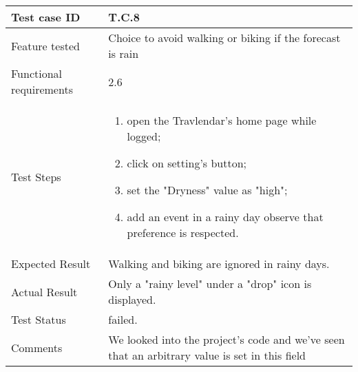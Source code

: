 \begin{table}[H]
	\begin{center}
		\begin{tabular}{ | p{} | p{} | }
		\hline
		Test case ID & T.C.8\\
		\hline
		Feature tested & Choice to avoid walking or biking if the forecast is rain\\
		\hline
		Functional requirements & 2.6  \\
		\hline
		Test Steps & 
			\begin{enumerate}
				\item open the Travlendar's home page while logged;
				\item click on setting's button;
				\item set the "Dryness" value as "high";
				\item  add an event in a rainy day observe that preference is respected.
			\end{enumerate} \\
		\hline
		Expected Result & Walking and biking are ignored in rainy days.\\
		\hline
		Actual Result & Only a "rainy level" under a "drop" icon is displayed.\\ 
		\hline
		Test Status & \color{Red}failed.\\ 
		\hline
		Comments & We looked into the project's code and we've seen that an arbitrary value is set in this field \\ 
		\hline
		\end{tabular}
	\end{center}
\end{table}

